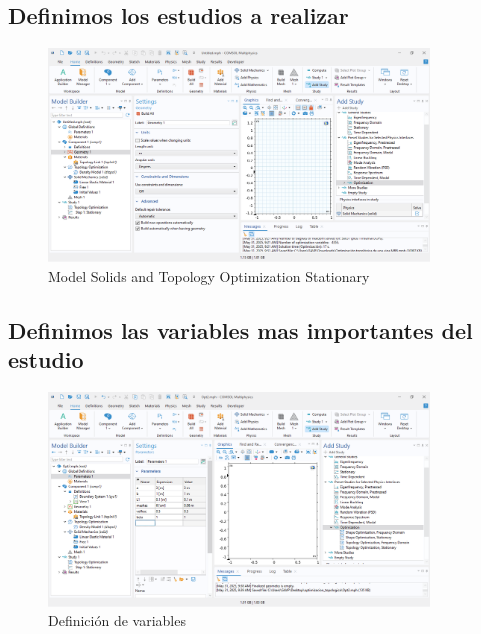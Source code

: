 \documentclass{article}
\theoremstyle{mytheoremstyle}
\theoremstyle{mytheoremstyle}
\theoremstyle{myproblemstyle}
\begin{document}
\subsection{Definimos los estudios a realizar}
  \begin{figure}[H]
              \centering
              \includegraphics[width=0.9\textwidth]{Definimos los estudios a realizar.png}
              \caption{Model Solids and Topology Optimization Stationary}
              \label{fig:comsol_estudios}
            \end{figure}
\subsection{Definimos las variables mas importantes del estudio}
\begin{figure}[H]
              \centering
              \includegraphics[width=0.9\textwidth]{variables.png}
              \caption{Definición de variables}
              \label{fig:comsol_variables}
            \end{figure}
\end{document}
